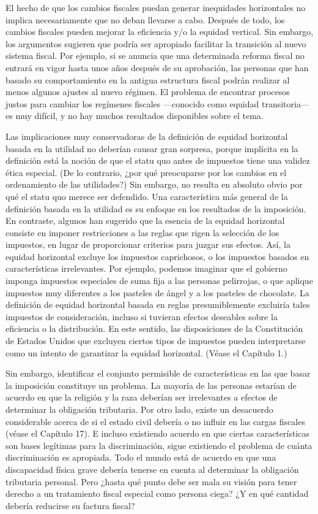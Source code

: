 \documentclass[10pt,a4paper]{article}
\begin{document}
El hecho de que los cambios fiscales puedan generar inequidades horizontales no implica necesariamente que no deban llevarse a cabo. Después de todo, los cambios fiscales pueden mejorar la eficiencia y/o la equidad vertical. Sin embargo, los argumentos sugieren que podría ser apropiado facilitar la transición al nuevo sistema fiscal. Por ejemplo, si se anuncia que una determinada reforma fiscal no entrará en vigor hasta unos años después de su aprobación, las personas que han basado su comportamiento en la antigua estructura fiscal podrán realizar al menos algunos ajustes al nuevo régimen. El problema de encontrar procesos justos para cambiar los regímenes fiscales —conocido como equidad transitoria— es muy difícil, y no hay muchos resultados disponibles sobre el tema.

Las implicaciones muy conservadoras de la definición de equidad horizontal basada en la utilidad no deberían causar gran sorpresa, porque implícita en la definición está la noción de que el statu quo antes de impuestos tiene una validez ética especial. (De lo contrario, ¿por qué preocuparse por los cambios en el ordenamiento de las utilidades?) Sin embargo, no resulta en absoluto obvio por qué el statu quo merece ser defendido. Una característica más general de la definición basada en la utilidad es su enfoque en los resultados de la imposición. En contraste, algunos han sugerido que la esencia de la equidad horizontal consiste en imponer restricciones a las reglas que rigen la selección de los impuestos, en lugar de proporcionar criterios para juzgar sus efectos. Así, la equidad horizontal excluye los impuestos caprichosos, o los impuestos basados en características irrelevantes. Por ejemplo, podemos imaginar que el gobierno imponga impuestos especiales de suma fija a las personas pelirrojas, o que aplique impuestos muy diferentes a los pasteles de ángel y a los pasteles de chocolate. La definición de equidad horizontal basada en reglas presumiblemente excluiría tales impuestos de consideración, incluso si tuvieran efectos deseables sobre la eficiencia o la distribución. En este sentido, las disposiciones de la Constitución de Estados Unidos que excluyen ciertos tipos de impuestos pueden interpretarse como un intento de garantizar la equidad horizontal. (Véase el Capítulo 1.)

Sin embargo, identificar el conjunto permisible de características en las que basar la imposición constituye un problema. La mayoría de las personas estarían de acuerdo en que la religión y la raza deberían ser irrelevantes a efectos de determinar la obligación tributaria. Por otro lado, existe un desacuerdo considerable acerca de si el estado civil debería o no influir en las cargas fiscales (véase el Capítulo 17). E incluso existiendo acuerdo en que ciertas características son bases legítimas para la discriminación, sigue existiendo el problema de cuánta discriminación es apropiada. Todo el mundo está de acuerdo en que una discapacidad física grave debería tenerse en cuenta al determinar la obligación tributaria personal. Pero ¿hasta qué punto debe ser mala su visión para tener derecho a un tratamiento fiscal especial como persona ciega? ¿Y en qué cantidad debería reducirse su factura fiscal?
\end{document}
